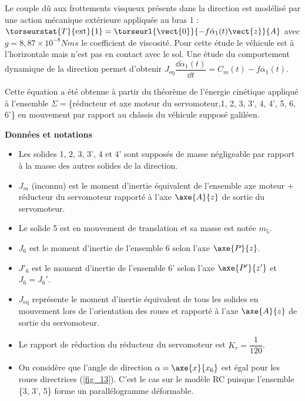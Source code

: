 Le couple dû aux frottements visqueux présents dans la direction est modélisé par une action mécanique extérieure appliquée au bras 1 : $\torseurstat{T}{\text{ext}}{1} = \torseurl{\vect{0}}{-f\dot{\alpha}_1(t) \vect{z}}{A}$ avec $g = 8,87 \times 10^{-8} \si{Nms}$  le coefficient de viscosité.
Pour cette étude le véhicule est à l’horizontale mais n’est pas en contact avec le sol. Une étude du comportement
dynamique de la direction permet d’obtenir 
$J_{\text{eq}}\dfrac{\dd\dot{\alpha}_1(t)}{\dd t} = C_m(t)-f\dot{\alpha_1}(t)$.

Cette équation a été obtenue à partir du théorème de l’énergie cinétique appliqué à l’ensemble 
$\Sigma =$\{réducteur et axe moteur du servomoteur,1, 2, 3, 3’, 4, 4’, 5, 6, 6’\} en mouvement par rapport au châssis du véhicule supposé galiléen.



\textbf{Données et notations}
\begin{itemize}
\item Les solides 1, 2, 3, 3’, 4 et 4’ sont supposés de masse négligeable par rapport à la masse des autres solides
de la direction.
\item $J_m$ (inconnu) est le moment d’inertie équivalent de l’ensemble {axe moteur + réducteur} du servomoteur rapporté à l’axe $\axe{A}{z}$ de sortie du servomoteur.
\item Le solide 5 est en mouvement de translation et sa masse est notée $m_5$.
\item $J_6$ est le moment d’inertie de l’ensemble 6 selon l’axe $\axe{P}{z}$.
\item $J'_6$ est le moment d’inertie de l’ensemble 6’ selon l’axe $\axe{P'}{z'}$ et $J_6 = J_6'$.
\item $J_{\text{eq}}$ représente le moment d’inertie équivalent de tous les solides en mouvement lors de l’orientation des roues et rapporté à l’axe $\axe{A}{z}$ de sortie du servomoteur.
\item Le rapport de réduction du réducteur du servomoteur est $K_r = \dfrac{1}{120}$.
\item On considère que l’angle de direction $\alpha = \axe{x}{x_6}$ est égal pour les roues directrices (\autoref{fig_13}). C’est le cas
sur le modèle RC puisque l’ensemble \{3, 3’, 5\} forme un parallélogramme déformable.
\end{itemize}



